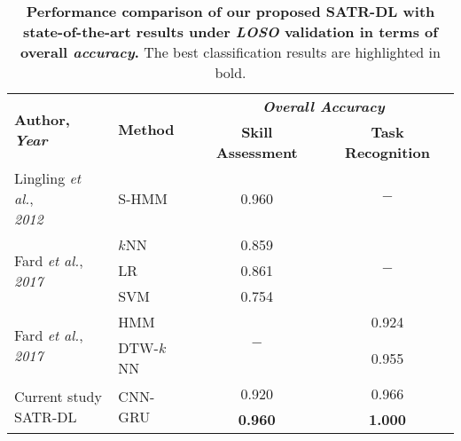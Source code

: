 \documentclass[letterpaper, 10 pt, conference, twoside]{IEEEtran}
\begin{document}
\begin{table}[tb]
\centering
\caption{ {\bf Performance comparison of our proposed SATR-DL with state-of-the-art results under \textit{LOSO} validation in terms of overall \textit{accuracy}.} The best classification results are highlighted in bold.  
}
\label{tab: rts_comparison}
\renewcommand\arraystretch{1.05}
\renewcommand\tabcolsep{5pt}
\begin{tabular}{llcc}
\toprule[\heavyrulewidth]     
\multirow{2}{*}{\textbf{Author, \textit{Year}}} & \multirow{2}{*}{\textbf{Method}} & \multicolumn{2}{c}{\textbf{\textit{Overall Accuracy}}}  \\  \cmidrule(lr){3-4}
 &  & \textbf{Skill Assessment} & \textbf{Task Recognition}   \\
 \midrule[\heavyrulewidth]     
 \multirow{2}{*}{\parbox{1.8cm}{Lingling \emph{et al.}, \\\textit{2012}~\cite{tao2012sparse}}}   & \multirow{2}{*}{S-HMM} & \multirow{2}{*}{0.960} & \multirow{2}{*}{$-$} \\
 &  &  &   \\
\cmidrule(lr){1-4}
\multirow{3}{*}{\parbox{1.8cm}{Fard \emph{et al.}, \\\textit{2017}~\cite{forestier2017jigsaw}}}   & $k$NN & 0.859 & \multirow{3}{*}{$-$} \\
 &  LR &  0.861 &    \\
 & SVM  & 0.754 &  \\
 \cmidrule(lr){1-4}
 \multirow{2}{*}{\parbox{1.8cm}{Fard \emph{et al.}, \\\textit{2017}~\cite{fard2017distance}}}   & HMM & \multirow{2}{*}{$-$}  &   0.924 \\
 &  DTW-$k$NN &  & 0.955  \\
  \cmidrule(lr){1-4}
 \multirow{2}{*}{\parbox{1.8cm}{Current study\\SATR-DL}}   & \multirow{2}{*}{CNN-GRU} & 0.920 &   0.966 \\ \cmidrule(lr){3-4}
 &  & \textbf{0.960}  & \textbf{1.000} \\
 \midrule[\heavyrulewidth]     
\end{tabular}
\vspace{-0.5cm}
\end{table}



\end{document}
